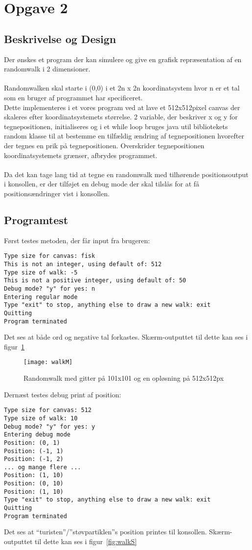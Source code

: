 \section{Opgave 2}
\subsection{Beskrivelse og Design}
Der ønskes et program der kan simulere og give en grafisk repræsentation af en randomwalk i 2 dimensioner. \\
\\
Randomwalken skal starte i (0,0) i et 2n x 2n koordinatsystem hvor n er et tal som en bruger af programmet har specificeret. \\
Dette implementeres i et vores program ved at lave et 512x512pixel canvas der skaleres efter koordinatsystemets størrelse. 2 variable, der beskriver x og y for tegnepositionen, initialiseres og i et while loop bruges java util bibliotekets random klasse til at bestemme en tilfældig ændring af tegnepositionen hvorefter der tegnes en prik på tegnepositionen. Overskrider tegnepositionen koordinatsystemets grænser, afbrydes programmet.
\\
\\
Da det kan tage lang tid at tegne en randomwalk med tilhørende positionsoutput i konsollen, er der tilføjet en debug mode der skal tilslås for at få positionsændringer vist i konsollen.
\subsection{Programtest}
Først testes metoden, der får input fra brugeren:

\begin{lstlisting}
Type size for canvas: fisk
This is not an integer, using default of: 512
Type size of walk: -5
This is not a positive integer, using default of: 50
Debug mode? "y" for yes: n
Entering regular mode
Type "exit" to stop, anything else to draw a new walk: exit
Quitting
Program terminated
\end{lstlisting}
Det ses at både ord og negative tal forkastes. Skærm-outputtet til dette kan ses i figur~\ref{fig:walkM}

\begin{figure}[h!]
	\centering
	\texttt{[image: walkM]}
		\caption{Randomwalk med gitter på 101x101 og en opløsning på 512x512px}\label{fig:walkM}
\end{figure}

Dernæst testes debug print af position:
\begin{lstlisting}
Type size for canvas: 512
Type size of walk: 10
Debug mode? "y" for yes: y
Entering debug mode
Position: (0, 1)
Position: (-1, 1)
Position: (-1, 2)
... og mange flere ...
Position: (1, 10)
Position: (0, 10)
Position: (1, 10)
Type "exit" to stop, anything else to draw a new walk: exit
Quitting
Program terminated
\end{lstlisting}
Det ses at ``turisten''/''støvpartiklen''s position printes til konsollen. Skærm-outputtet til dette kan ses i figur~\ref{fig:walkS}

